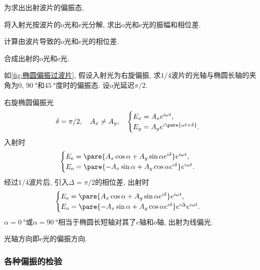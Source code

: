 \documentclass{ctexart}
\begin{document}
为求出出射波片的偏振态,
\begin{cenum}
    \item 将入射光按波片的o光和e光分解, 求出o光和e光的振幅和相位差.
    \item 计算由波片导致的o光和e光的相位差.
    \item 合成出射的o光和e光.
\end{cenum}
\begin{sample}
    \begin{ex}
        如\cref{fig:椭圆偏振过波片}, 假设入射光为右旋偏振, 求$1/4$波片的光轴与椭圆长轴的夹角为$0$, $\SI{90}{\degree}$和$\SI{45}{\degree}$度时的偏振态. 设o光延迟$\pi/2$.
    \end{ex}
    \begin{solution}
        右旋椭圆偏振光
        \[ \delta = \pi/2, \quad A_x \neq A_y, \quad \begin{cases}
            E_x = A_x e^{i\omega t}, \\
            E_y = A_y e^{i\pare{\omega t + \delta}}.
        \end{cases} \]
        入射时
        \[ \begin{cases}
            E_e = \pare{A_x \cos\alpha + A_y\sin\alpha e^{i\delta}}e^{i\omega t}, \\
            E_o = \pare{-A_x\sin\alpha + A_y\cos\alpha e^{i\delta}}e^{i\omega t}.
        \end{cases} \]
        经过$1/4$波片后, 引入$\Delta = \pi/2$的相位差, 出射时
        \[ \begin{cases}
            E_e = \pare{A_x \cos\alpha + A_y\sin\alpha e^{i\delta}}e^{i\omega t}, \\
            E_o = \pare{-A_x\sin\alpha + A_y\cos\alpha e^{i\delta}}e^{i\Delta}e^{i\omega t}.
        \end{cases} \]
        $\alpha = \SI{0}{\degree}$或$\alpha = \SI{90}{\degree}$相当于椭圆长短轴对其了$e$轴和$o$轴, 出射为线偏光.
    \end{solution}
    \begin{remark}
        光轴方向即e光的偏振方向.
    \end{remark}
\end{sample}


\subsubsection{各种偏振的检验} %
\label{ssub:各种偏振的检验}
\end{document}
